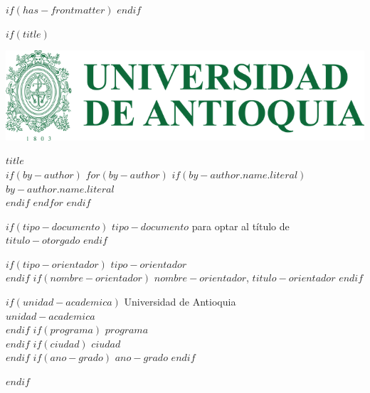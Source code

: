 $if(has-frontmatter)$
\frontmatter
$endif$

$if(title)$
\cleardoublepage
\thispagestyle{empty}

{\centering

\includegraphics{assets/escudo_udea.png}

\vspace{2cm}
{\bfseries $title$}\\[2cm]

\vspace{2cm}
$if(by-author)$
$for(by-author)$
$if(by-author.name.literal)$
{$by-author.name.literal$}\\
$endif$
$endfor$
$endif$

\vspace{2cm}
$if(tipo-documento)$
{$tipo-documento$ para optar al título de $titulo-otorgado$}
$endif$

\vspace{2cm}
$if(tipo-orientador)$
{$tipo-orientador$}\\
$endif$
$if(nombre-orientador)$
{$nombre-orientador$, $titulo-orientador$}
$endif$

\vspace{2cm}
$if(unidad-academica)$
{Universidad de Antioquia}\\
{$unidad-academica$}\\
$endif$
$if(programa)$
{$programa$}\\
$endif$
$if(ciudad)$
{$ciudad$}\\
$endif$
$if(ano-grado)$
{$ano-grado$}
$endif$

}

$endif$
\newpage


